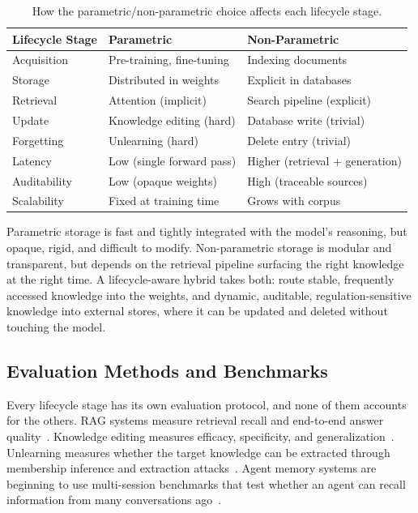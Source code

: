 \documentclass[10pt]{article}
\begin{document}
\begin{table}[t]
\centering
\caption{How the parametric/non-parametric choice affects each lifecycle stage.}
\label{tab:parametric_comparison}
\small
\begin{tabular}{@{}lll@{}}
\toprule
\textbf{Lifecycle Stage} & \textbf{Parametric} & \textbf{Non-Parametric} \\
\midrule
Acquisition & Pre-training, fine-tuning & Indexing documents \\
Storage & Distributed in weights & Explicit in databases \\
Retrieval & Attention (implicit) & Search pipeline (explicit) \\
Update & Knowledge editing (hard) & Database write (trivial) \\
Forgetting & Unlearning (hard) & Delete entry (trivial) \\
\midrule
Latency & Low (single forward pass) & Higher (retrieval + generation) \\
Auditability & Low (opaque weights) & High (traceable sources) \\
Scalability & Fixed at training time & Grows with corpus \\
\bottomrule
\end{tabular}
\end{table}

Parametric storage is fast and tightly integrated with the model's reasoning, but opaque, rigid, and difficult to modify. Non-parametric storage is modular and transparent, but depends on the retrieval pipeline surfacing the right knowledge at the right time. A lifecycle-aware hybrid takes both: route stable, frequently accessed knowledge into the weights, and dynamic, auditable, regulation-sensitive knowledge into external stores, where it can be updated and deleted without touching the model.

\subsection{Evaluation Methods and Benchmarks}

Every lifecycle stage has its own evaluation protocol, and none of them accounts for the others. RAG systems measure retrieval recall and end-to-end answer quality~\citep{es2024ragas, chen2024benchmarking}. Knowledge editing measures efficacy, specificity, and generalization~\citep{yao2023editingsurvey}. Unlearning measures whether the target knowledge can be extracted through membership inference and extraction attacks~\citep{maini2024tofu, carlini2021extraction}. Agent memory systems are beginning to use multi-session benchmarks that test whether an agent can recall information from many conversations ago~\citep{hu2025agentmemory}.
\end{document}
